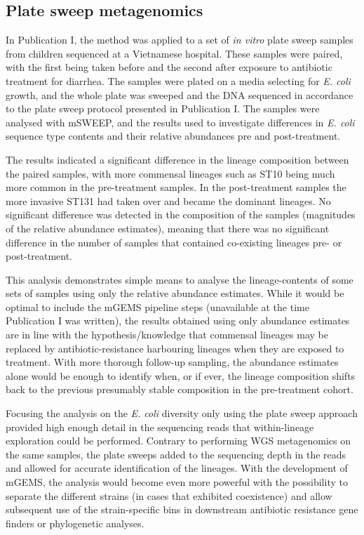 \documentclass[officiallayout]{tktla}
\begin{document}
\subsection{Plate sweep metagenomics}

In Publication I, the method was applied to a set of \textit{in vitro}
plate sweep samples from children sequenced at a Vietnamese
hospital. These samples were paired, with the first being taken before
and the second after exposure to antibiotic treatment for
diarrhea. The samples were plated on a media selecting for
\textit{E. coli} growth, and the whole plate was sweeped and the DNA
sequenced in accordance to the plate sweep protocol presented in
Publication I. The samples were analysed with mSWEEP, and the results
used to investigate differences in \textit{E. coli} sequence type
contents and their relative abundances pre and post-treatment.

The results indicated a significant difference in the lineage
composition between the paired samples, with more commensal lineages
such as ST10 \citep{maklin_strong_2022} being much more common in the
pre-treatment samples. In the post-treatment samples the more invasive
ST131 \citep{maklin_strong_2022} had taken over and became the
dominant lineages. No significant difference was detected in the
composition of the samples (magnitudes of the relative abundance
estimates), meaning that there was no significant difference in the
number of samples that contained co-existing lineages pre- or
post-treatment.

This analysis demonstrates simple means to analyse the
lineage-contents of some sets of samples using only the relative
abundance estimates. While it would be optimal to include the mGEMS
pipeline steps (unavailable at the time Publication I was written), the
results obtained using only abundance estimates are in line with the
hypothesis/knowledge that commensal lineages may be replaced by
antibiotic-resistance harbouring lineages when they are exposed to
treatment. With more thorough follow-up sampling, the abundance
estimates alone would be enough to identify when, or if ever, the
lineage composition shifts back to the previous presumably stable
composition in the pre-treatment cohort.

Focusing the analysis on the \textit{E. coli} diversity only using the
plate sweep approach provided high enough detail in the sequencing
reads that within-lineage exploration could be performed. Contrary to
performing WGS metagenomics on the same samples, the plate sweeps
added to the sequencing depth in the reads and allowed for accurate
identification of the lineages. With the development of mGEMS, the
analysis would become even more powerful with the possibility to
separate the different strains (in cases that exhibited coexistence)
and allow subsequent use of the strain-specific bins in downstream
antibiotic resistance gene finders or phylogenetic analyses.
\end{document}
